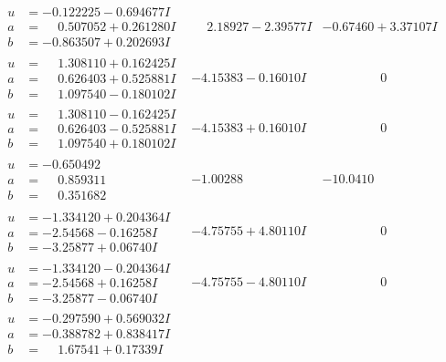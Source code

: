 \documentclass[1p]{elsarticle_modified}
\theoremstyle{definition}
\begin{document}
$$\begin{array}{c|c|c}
\begin{aligned}
u &= -0.122225 - 0.694677 I \\
a &= \phantom{-}0.507052 + 0.261280 I \\
b &= -0.863507 + 0.202693 I\end{aligned}
 & \phantom{-}2.18927 - 2.39577 I & -0.67460 + 3.37107 I \\ \hline\begin{aligned}
u &= \phantom{-}1.308110 + 0.162425 I \\
a &= \phantom{-}0.626403 + 0.525881 I \\
b &= \phantom{-}1.097540 - 0.180102 I\end{aligned}
 & -4.15383 - 0.16010 I & \phantom{-0.000000 } 0 \\ \hline\begin{aligned}
u &= \phantom{-}1.308110 - 0.162425 I \\
a &= \phantom{-}0.626403 - 0.525881 I \\
b &= \phantom{-}1.097540 + 0.180102 I\end{aligned}
 & -4.15383 + 0.16010 I & \phantom{-0.000000 } 0 \\ \hline\begin{aligned}
u &= -0.650492\phantom{ +0.000000I} \\
a &= \phantom{-}0.859311\phantom{ +0.000000I} \\
b &= \phantom{-}0.351682\phantom{ +0.000000I}\end{aligned}
 & -1.00288\phantom{ +0.000000I} & -10.0410\phantom{ +0.000000I} \\ \hline\begin{aligned}
u &= -1.334120 + 0.204364 I \\
a &= -2.54568 - 0.16258 I \\
b &= -3.25877 + 0.06740 I\end{aligned}
 & -4.75755 + 4.80110 I & \phantom{-0.000000 } 0 \\ \hline\begin{aligned}
u &= -1.334120 - 0.204364 I \\
a &= -2.54568 + 0.16258 I \\
b &= -3.25877 - 0.06740 I\end{aligned}
 & -4.75755 - 4.80110 I & \phantom{-0.000000 } 0 \\ \hline\begin{aligned}
u &= -0.297590 + 0.569032 I \\
a &= -0.388782 + 0.838417 I \\
b &= \phantom{-}1.67541 + 0.17339 I\end{aligned}

\end{array}$$
\end{document}
